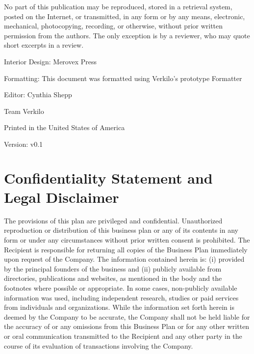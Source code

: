 \documentclass[10pt,openany]{book}
\begin{document}
  \footnotesize
  \par\noindent No part of this publication may be reproduced, stored in
a retrieval system, posted on the Internet, or transmitted, in any form
or by any means, electronic, mechanical, photocopying, recording, or
otherwise, without prior written permission from the authors. The only
exception is by a reviewer, who may quote short excerpts in a
review.\newline


  \footnotesize
  

  \par\noindent Interior Design: Merovex Press %
      \par\noindent Formatting: This document was formatted using
Verkilo's prototype Formatter
      \par\noindent Editor: Cynthia Shepp
  \newline

  \par\noindent       \par\noindent Team Verkilo
    \newline

  
  \par\noindent Printed in the United States of America
  \newline

  
    \par\noindent Version: v0.1
    \vspace*{\fill}
  \clearpage\normalsize

      \section*{Confidentiality Statement and Legal Disclaimer}

      The provisions of this plan are privileged and confidential.
      Unauthorized reproduction or distribution of this business plan or
      any of its contents in any form or under any circumstances without
      prior written consent is prohibited. The Recipient is responsible
      for returning all copies of the Business Plan immediately upon
      request of the Company. The information contained herein is: (i)
      provided by the principal founders of the business and (ii)
      publicly available from directories, publications and websites, as
      mentioned in the body and the footnotes where possible or
      appropriate. In some cases, non-publicly available information was
      used, including independent research, studies or paid services
      from individuals and organizations. While the information set
      forth herein is deemed by the Company to be accurate, the Company
      shall not be held liable for the accuracy of or any omissions from
      this Business Plan or for any other written or oral communication
      transmitted to the Recipient and any other party in the course of
      its evaluation of transactions involving the Company.
\end{document}
